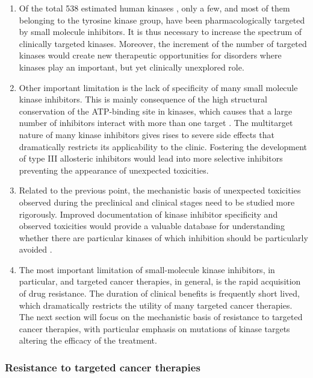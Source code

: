 \documentclass[12pt, b5paper,twoside]{tesi_upf}
\begin{document}
\begin{enumerate}

\item Of the total 538 estimated human kinases \cite{Manning2002}, only a few, and most of them belonging to the tyrosine kinase group, have been pharmacologically targeted by small molecule inhibitors. It is thus necessary to increase the spectrum of clinically targeted kinases. Moreover, the increment of the number of targeted kinases would create new therapeutic opportunities for disorders where kinases play an important, but yet clinically unexplored role. 
\item Other important limitation is the lack of specificity of many small molecule kinase inhibitors. This is mainly consequence of the high structural conservation of the ATP-binding site in kinases, which causes that a large number of inhibitors interact with more than one target \cite{Davis2011}. The multitarget nature of many kinase inhibitors gives rises to severe side effects that dramatically restricts its applicability to the clinic. Fostering the development of type III allosteric inhibitors would lead into more selective inhibitors preventing the appearance of unexpected toxicities.  
\item Related to the previous point, the mechanistic basis of unexpected toxicities observed during the preclinical and clinical stages need to be studied more rigorously. Improved documentation of kinase inhibitor specificity and observed toxicities would provide a valuable database for understanding whether there are particular kinases of which inhibition should be particularly avoided \cite{Zhang2009a}.
\item The most important limitation of small-molecule kinase inhibitors, in particular, and targeted cancer therapies, in general, is the rapid acquisition of drug resistance. The duration of clinical benefits is frequently short lived, which dramatically restricts the utility of many targeted cancer therapies. The next section will focus on the mechanistic basis of resistance to targeted cancer therapies, with particular emphasis on mutations of kinase targets altering the efficacy of the treatment.    
 \end{enumerate}
 


\subsubsection{Resistance to targeted cancer therapies}
\end{document}

